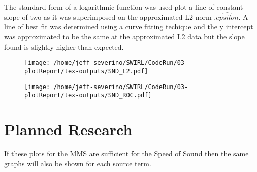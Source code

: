 \documentclass[a4paper]{article}
\begin{document}
The standard form of a logarithmic function was used plot a line of constant
slope of two as it was superimposed on the approximated L2 norm ,$\hat{epsilon}$. 
A line of best fit was determined using a curve fitting techique and the y 
intercept was approximated to be the same at the approximated L2 data but the slope
found is slightly higher than expected. 


\begin{figure}[!]
    \centering
    \texttt{[image: /home/jeff-severino/SWIRL/CodeRun/03-plotReport/tex-outputs/SND\_L2.pdf]}
    \caption{}
    \label{fig:4}
\end{figure}


\begin{figure}[!]
    \centering
    \texttt{[image: /home/jeff-severino/SWIRL/CodeRun/03-plotReport/tex-outputs/SND\_ROC.pdf]}
    \caption{}
    \label{fig:5}
\end{figure}

\section{Planned Research}
If these plots for the MMS are sufficient for the Speed of Sound then the same 
graphs will also be shown for each source term. 
\end{document}
